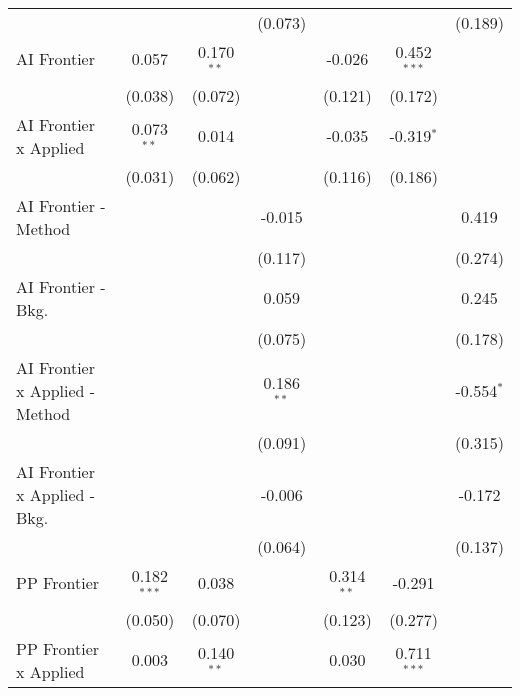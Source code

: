 \begin{tabular}{lcccccc}
                                  &               &               & (0.073)       &               &               & (0.189)\\   
   AI Frontier                    & 0.057         & 0.170$^{**}$  &               & -0.026        & 0.452$^{***}$ &   \\   
                                  & (0.038)       & (0.072)       &               & (0.121)       & (0.172)       &   \\   
   AI Frontier x Applied          & 0.073$^{**}$  & 0.014         &               & -0.035        & -0.319$^{*}$  &   \\   
                                  & (0.031)       & (0.062)       &               & (0.116)       & (0.186)       &   \\   
   AI Frontier - Method           &               &               & -0.015        &               &               & 0.419\\   
                                  &               &               & (0.117)       &               &               & (0.274)\\   
   AI Frontier - Bkg.             &               &               & 0.059         &               &               & 0.245\\   
                                  &               &               & (0.075)       &               &               & (0.178)\\   
   AI Frontier x Applied - Method &               &               & 0.186$^{**}$  &               &               & -0.554$^{*}$\\   
                                  &               &               & (0.091)       &               &               & (0.315)\\   
   AI Frontier x Applied - Bkg.   &               &               & -0.006        &               &               & -0.172\\   
                                  &               &               & (0.064)       &               &               & (0.137)\\   
   PP Frontier                    & 0.182$^{***}$ & 0.038         &               & 0.314$^{**}$  & -0.291        &   \\   
                                  & (0.050)       & (0.070)       &               & (0.123)       & (0.277)       &   \\   
   PP Frontier x Applied          & 0.003         & 0.140$^{**}$  &               & 0.030         & 0.711$^{***}$ &   \\   

\end{tabular}
